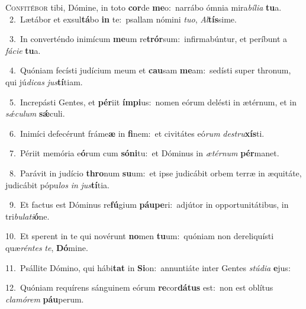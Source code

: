 \lettrine{\initial\textcolor{\initialcolor}{C}}{onfitébor} tibi, Dómine, in toto \textbf{cor}\-de \textbf{me}\-o:~\star narrábo ómnia mira\-\textit{bí}\-\textit{li}\textit{a} \textbf{tu}\-a.\\
{\numbfont\textcolor{\numbcolor}{~2.}}~Lætábor et exsul\-\textbf{tá}\-bo \textbf{in} te:~\star psallam nómini \textit{tu}\-\textit{o}, \textit{Al}\-\textbf{tís}sime.\par
{\numbfont\textcolor{\numbcolor}{~3.}}~In converténdo inimícum \textbf{me}\-um re\-\textbf{trór}\-sum:~\star infirmabúntur, et períbunt a \textit{fá}\-\textit{ci}\textit{e} \textbf{tu}\-a.\par
{\numbfont\textcolor{\numbcolor}{~4.}}~Quóniam fecísti judícium meum et \textbf{cau}\-sam \textbf{me}\-am:~\star sedísti super thronum, qui jú\-\textit{di}\-\textit{cas} \textit{jus}\-\textbf{tí}tiam.\par
{\numbfont\textcolor{\numbcolor}{~5.}}~Increpásti Gentes, et \textbf{pér}\-iit \textbf{ím}\-\textbf{pi}us:~\star nomen eórum delésti in ætérnum, et in \textit{sǽ}\-\textit{cu}\textit{lum} \textbf{sǽ}\-culi.\par
{\numbfont\textcolor{\numbcolor}{~6.}}~Inimíci defecérunt fráme\textbf{æ} in \textbf{fi}\-nem:~\star et civitátes eó\textit{rum} \textit{de}\-\textit{stru}\textbf{xís}ti.\par
{\numbfont\textcolor{\numbcolor}{~7.}}~Périit memória e\-\textbf{ó}\-rum cum \textbf{só}\-\textbf{ni}tu:~\star et Dóminus in \textit{æ}\-\textit{tér}\textit{num} \textbf{pér}\-manet.\par
{\numbfont\textcolor{\numbcolor}{~8.}}~Parávit in judício \textbf{thro}\-num \textbf{su}\-um:~\star et ipse judicábit orbem terræ in æquitáte, judicábit pópu\textit{los} \textit{in} \textit{jus}\-\textbf{tí}tia.\par
{\numbfont\textcolor{\numbcolor}{~9.}}~Et factus est Dóminus re\-\textbf{fú}\-gium \textbf{páu}\-\textbf{pe}ri:~\star adjútor in opportunitátibus, in tri\-\textit{bu}\-\textit{la}\textit{ti}\textbf{ó}ne.\par
{\numbfont\textcolor{\numbcolor}{10.}}~Et sperent in te qui novérunt \textbf{no}\-men \textbf{tu}\-um:~\star quóniam non dereliquísti quæ\-\textit{rén}\-\textit{tes} \textit{te}\-, \textbf{Dó}\-mine.\par
{\numbfont\textcolor{\numbcolor}{11.}}~Psállite Dómino, qui hábi\textbf{tat} in \textbf{Si}\-on:~\star annuntiáte inter Gentes \textit{stú}\-\textit{di}\textit{a} \textbf{e}\-jus:\par
{\numbfont\textcolor{\numbcolor}{12.}}~Quóniam requírens sánguinem eórum \textbf{re}\-cor\-\textbf{dá}\-\textbf{tus} est:~\star non est oblítus \textit{cla}\-\textit{mó}\textit{rem} \textbf{páu}\-perum.\par
